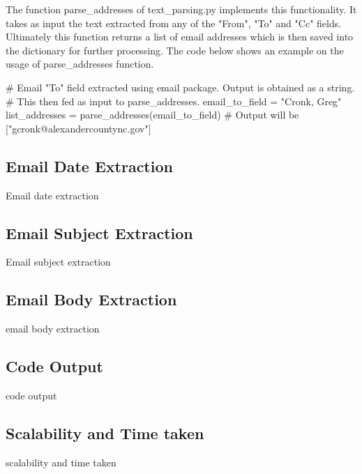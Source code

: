 \documentclass[fleqn]{MJDArticle}
\begin{document}
The function parse\_addresses of text\_parsing.py implements this functionality. It takes as input the text extracted from any of the "From", "To" and "Cc" fields. Ultimately this function returns a list of email addresses which is then saved into the dictionary for further processing. The code below shows an example on the usage of parse\_addresses function. 
\begin{code}
# Email "To" field extracted using email package. Output is obtained as a string.
# This then fed as input to parse_addresses.
email_to_field = "Cronk, Greg"
list_addresses = parse_addresses(email_to_field)
# Output will be ["gcronk@alexandercountync.gov"]
\end{code}
\subsection{Email Date Extraction}
Email date extraction
\subsection{Email Subject Extraction}
Email subject extraction
\subsection{Email Body Extraction}
email body extraction
\subsection{Code Output}
code output
\subsection{Scalability and Time taken}
scalability and time taken



 


\end{document}

